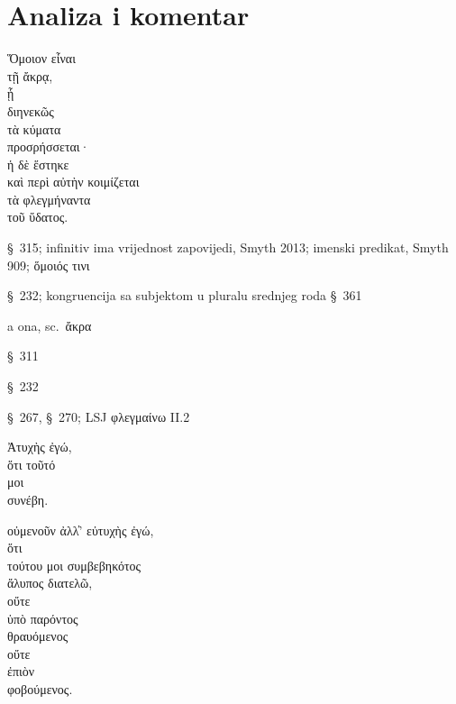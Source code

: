 \section*{Analiza i komentar}


{\large
\begin{greek}
\noindent  Ὅμοιον εἶναι \\
\tabto{2em} τῇ ἄκρᾳ, \\
\tabto{4em} ᾗ \\
\tabto{6em} διηνεκῶς \\
\tabto{4em} τὰ κύματα \\
\tabto{4em} προσρήσσεται· \\
ἡ δὲ ἕστηκε \\
καὶ περὶ αὐτὴν κοιμίζεται \\
\tabto{2em} τὰ φλεγμήναντα \\
\tabto{4em} τοῦ ὕδατος. \\

\end{greek}
}

\begin{description}[noitemsep]
\item[ Ὅμοιον εἶναι] §~315; infinitiv ima vrijednost zapovijedi, Smyth 2013; imenski predikat, Smyth 909; \textgreek[variant=ancient]{ὅμοιός τινι}
\item[προσρήσσεται] §~232; kongruencija sa subjektom u pluralu srednjeg roda §~361
\item[ἡ δὲ] a ona, sc.\ ἄκρα
\item[ἕστηκε] §~311
\item[κοιμίζεται] §~232
\item[τὰ φλεγμήναντα] §~267, §~270; LSJ φλεγμαίνω II.2

\end{description}


{\large
\begin{greek}
\noindent Ἀτυχὴς ἐγώ, \\
\tabto{2em} ὅτι τοῦτό \\
\tabto{2em} μοι \\
\tabto{2em} συνέβη.

\noindent οὐμενοῦν ἀλλ̓' εὐτυχὴς ἐγώ, \\
\tabto{2em} ὅτι \\
\tabto{4em} τούτου μοι συμβεβηκότος \\
\tabto{2em} ἄλυπος διατελῶ, \\
οὔτε \\
\tabto{4em} ὑπὸ παρόντος \\
\tabto{2em} θραυόμενος \\
οὔτε \\
\tabto{2em} ἐπιὸν \\
\tabto{2em} φοβούμενος. \\

\end{greek}
}

